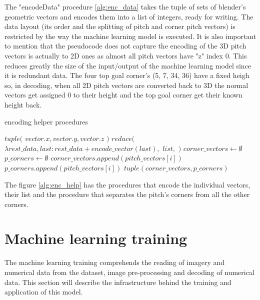 \documentclass[
    11pt,
    oneside
]{report}
\begin{document}
The "encodeData" procedure \ref{alg:enc_data} takes the tuple of sets of blender's geometric vectors and encodes them into a list of integers, ready for writing. The data layout (its order and the splitting of pitch and corner pitch vectors) is restricted by the way the machine learning model is executed. It is also important to mention that the pseudocode does not capture the encoding of the 3D pitch vectors is actually to 2D ones as almost all pitch vectors have "z" index 0. This reduces greatly the size of the input/output of the machine learning model since it is redundant data. The four top goal corner's (5, 7, 34, 36) have a fixed heigh so, in decoding, when all 2D pitch vectors are converted back to 3D the normal vectors get assigned 0 to their height and the top goal corner get their known height back.


\begin{algorithm}[H]
\begin{algorithmic}
\caption{encoding helper procedures}\label{alg:enc_help}
    \Return $tuple($
        \State \indent $vector.x, vector.y, vector.z$
    \State $)$
\EndProcedure
{}
    \Return $reduce($
        \State \indent $\lambda rest\_data, last: rest\_data + encode\_vector(last),$
        \State \indent $list,$
        \State \indent \emptyset {}
    \State $)$
\EndProcedure
{}
    \State $corner\_vectors \gets \emptyset$
    \State $p\_corners \gets \emptyset$
            \State $corner\_vectors.append(pitch\_vectors[i])$
        \Else
            \State $p\_corners.append(pitch\_vectors[i])$
        \EndIf
    \EndFor
    \State
    \Return $tuple(corner\_vectors, p\_corners)$
\EndProcedure
\end{algorithmic}
\end{algorithm}


The figure \ref{alg:enc_help} has the procedures that encode the individual vectors, their list and the procedure that separates the pitch's corners from all the other corners.




\section{Machine learning training}


The machine learning training comprehends the reading of imagery and numerical data from the dataset, image pre-processing and decoding of numerical data. This section will describe the infrastructure behind the training and application of this model.
\end{document}

